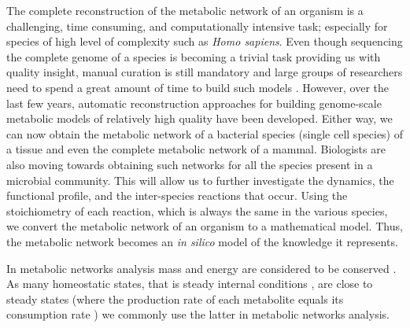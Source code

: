    The complete reconstruction of the metabolic network of an organism is a
   challenging, time consuming, and computationally intensive task; especially for species of high level of complexity such as \emph{Homo sapiens}.
   Even though sequencing the complete genome of a species is becoming a trivial task
   providing us with quality insight, manual curation is still mandatory and large groups 
   of researchers need to spend a great amount of time to build such models \citep{thiele2010protocol}.
   However, over the last few years, automatic reconstruction approaches for building genome-scale metabolic 
   models \citep{machado2018fast} of relatively high quality have been developed.
   Either way, we can now obtain the metabolic network of a bacterial species (single cell species)
   of a tissue and even the complete metabolic network of a mammal.
   Biologists are also moving towards obtaining such networks for all the species present in a microbial community. This will allow us to further investigate the dynamics, the functional profile, and the inter-species reactions that occur.
   Using the stoichiometry of each reaction, which is always the same in the various species,
   we convert the metabolic network of an organism to a mathematical model.
   Thus, the metabolic network becomes an \emph{in silico} model of the knowledge it represents.
   
   In metabolic networks analysis mass and energy are considered to be conserved
   \citep{palsson2009metabolic}. As many homeostatic states, that is steady internal
   conditions \citep{shishvan2018homeostatic}, are close to steady states (where the
   production rate of each metabolite equals its consumption rate
   \citep{cakmak2012new}) we commonly use the latter in metabolic networks analysis.


